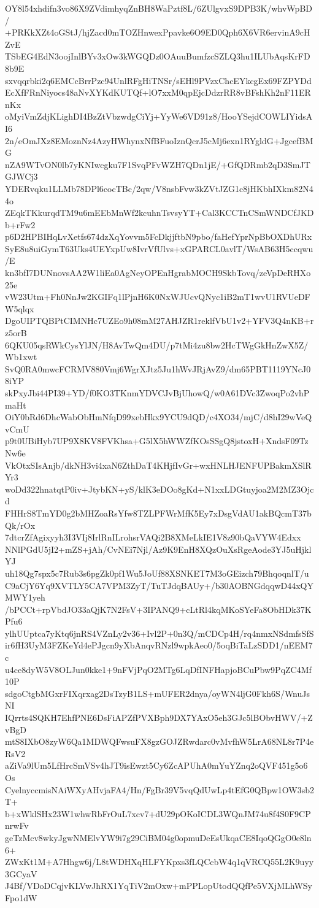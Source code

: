 OY8l54xhdifn3vo86X9ZVdimhyqZnBH8WaPztf8L/6ZUlgvxS9DPB3K/whvWpBD/
+PRKkXZt4oGStJ/hjZacd0mTOZHnwexPpavke6O9ED0Qph6X6VR6ervinA9cHZvE
TSbEG4EdN3oojInlBYv3xOw3kWGQDz0OAuuBumfzcSZLQ3hu1ILUbAqsKrFD8b9E
sxvqqrbki2q6EMCcBrrPzc94UnlRFgHiTNSr/sEHl9PVzxChcEYkcgEx69FZPYDd
EcXfFRnNiyocs48aNvXYKdKUTQf+lO7xxM0qpEjcDdzrRR8vBFshKh2nF11ERnKx
oMyiVmZdjKLighDI4BzZtVbzwdgCiYj+YyWe6VD91z8/HooYSejdCOWLIYidsAI6
2n/eOmJXz8EMoznNz4AzyHWhynxNfBFuoIznQcrJ5cMj6exn1RYgldG+JgcefBMG
nZA9WTvON0lb7yKNIwcgku7F1SvqPFvWZH7QDn1jE/+GfQDRmb2qD3SmJTGJWCj3
YDERvqku1LLMb78DPl6cocTBc/2qw/V8nsbFvw3kZVtJZG1c8jHKbhIXkm82N44o
ZEqkTKkurqdTM9u6mEEbMnWf2kcuhnTsvsyYT+Cal3KCCTnCSmWNDCfJKDb+rFw2
p6D2HPBIHqLvXetfs674dzXqYovvm5FcDkjjftbN9pbo/faHefYprNpBbOXDhURx
SyE8u8uiGymT63Uks4UEYxpUw8IvrVfUlvs+xGPARCL0avlT/WsAB63H5ccqwu/E
kn3bfI7DUNnovsAA2W1liEa0AgNeyOPEnHgrabMOCH9SkbTovq/zeVpDeRHXo25e
vW23Utm+Fh0NnJw2KGIFq1lPjnH6K0NxWJUcvQNyc1iB2mT1wvU1RVUeDFW5qlqx
DgoUIPTQBPtCIMNHc7UZEo9h08mM27AHJZR1reklfVbU1v2+YFV3Q4nKB+rz5orB
6QKU05qsRWkCysYlJN/H8AvTwQm4DU/p7tMi4zu8bw2HcTWgGkHnZwX5Z/Wb1xwt
SvQ0RA0mwcFCRMV880Vmj6WgrXJtz5Ju1hWvJRjAvZ9/dm65PBT1119YNcJ08iYP
skPxyJbi44PI39+YD/f0KO3TKnmYDVCJvBjUhowQ/w0A61DVc3ZwoqPo2vhPmaHt
OiY0bRd6DhcWabObHmNfqD99xebHkx9YCU9dQD/c4XO34/mjC/d8hI29wVeQvCmU
p9t0UBiHyb7UP9X8KV8FVKhsa+G5lX5hWWZfKOsSSgQ8jstoxH+XndsF09TzNw6e
VkOtxSIsAnjb/dkNH3vi4xaN6ZthDaT4KHjfIvGr+wxHNLHJENFUPBakmXSlRYr3
woDd322hnatqtP0iv+JtybKN+yS/klK3eDOo8gKd+N1xxLDGtuyjoa2M2MZ3Ojcd
FHHrS8TmYD0g2bMHZoaRsYfw8TZLPFWrMfK5Ey7xDsgVdAU1akBQcmT37bQk/rOx
7dtcrZfAgixyyh3I3VIj8IrlRnILrohsrVAQi2B8XMeLkIE1V8z90bQaVYW4Edxx
NNlPGdU5jI2+mZS+jAh/CvNEi7Njl/Az9K9EnH8XQzOuXsRgeAode3YJ5uHjklYJ
uh18Qg7spx5c7Rub3s6pgZk0pf1Wu5JoUf88XSNKET7M3oGEizch79BhqoqnlT/u
C9aCjY6Yq9XVTLY5CA7VPM3ZyT/TuTJdqBAUy+/b30AOBNGdqqwD44xQYMWY1yeh
/bPCCt+rpVbdJO33aQjK7N2FsV+3IPANQ9+cLtRl4kqMKoSYeFa8ObHDk37KPfu6
ylhUUptca7yKtq6jnRS4VZnLy2v36+Ivl2P+0n3Q/mCDCp4H/rq4nmxNSdmfsSfS
ir6fH3UyM3FZKeYd4ePJgcn9yXbAnqvRNzl9wpkAeo0/5oqBiTaLzSDD1/nEEM7c
u4ce8dyW5V8OLJun0kke1+9nFVjPqO2MTg6LqDfINFHapjoBCuPbw9PqZC4Mf10P
sdgoCtgbMGxrFIXqrxag2DsTzyB1LS+mUFER2dnya/oyWN4ljG0Fkh6S/WnuJsNI
IQrrts4SQKH7EhfPNE6DsFiAPZfPVXBph9DX7YAxO5eh3GJc5lBObvHWV/+ZvBgD
mtS8IXbO8zyW6Qa1MDWQFwsuFX8gzGOJZRwdarc0vMvfhW5LrA68NL8r7P4eRsV2
aZiVa9lUm5LfHrcSmVSv4hJT9isEwzt5Cy6ZcAPUhA0mYuYZnq2oQVF451g5o6Os
CyelnyccmisNAiWXyAHvjaFA4/Hn/FgBr39V5vqQdUwLp4tEfG0QBpw1OW3sb2T+
b+xWklSHx23W1whwRbFrOuL7xcv7+dU29pOKoICDL3WQnJM74u8f4S0F9CPnrwFv
geTzMcv8wkyJgwNMElvYW9i7g29CiBM04g0opmuDeEsUkqaCE8IqoQGgO0e8ln6+
ZWxKt1M+A7Hhgw6j/L8tWDHXqHLFYKpxs3fLQCcbW4q1qVRCQ55L2K9uyy3GCyaV
J4Bf/VDoDCqjvKLVwJhRX1YqTiV2mOxw+mPPLopUtodQQfPe5VXjMLhWSyFpo1dW
